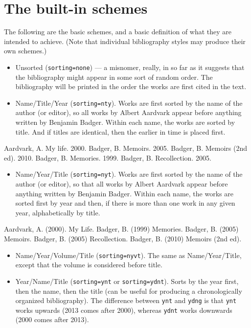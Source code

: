 \section{The built-in schemes}

The following are the basic schemes, and a basic definition of what they
are intended to achieve. (Note that individual bibliography styles may
produce their own schemes.)

\begin{itemize}
\item
  Unsorted (\texttt{sorting=none}) --- a misnomer, really, in so far as
  it suggests that the bibliography might appear in some sort of random
  order. The bibliography will be printed in the order the works are
  first cited in the text.
\item
  Name/Title/Year (\texttt{sorting=nty}). Works are first sorted by the
  name of the author (or editor), so all works by Albert Aardvark appear
  before anything written by Benjamin Badger. Within each name, the
  works are sorted by title. And if titles are identical, then the
  earlier in time is placed first.
\end{itemize}

Aardvark, A. My life. 2000. Badger, B. Memoirs. 2005. Badger, B. Memoirs
(2nd ed). 2010. Badger, B. Memories. 1999. Badger, B. Recollection.
2005.

\begin{itemize}
\item
  Name/Year/Title (\texttt{sorting=nyt}). Works are first sorted by the
  name of the author (or editor), so that all works by Albert Aardvark
  appear before anything written by Benjamin Badger. Within each name,
  the works are sorted first by year and then, if there is more than one
  work in any given year, alphabetically by title.
\end{itemize}

Aardvark, A. (2000). My Life. Badger, B. (1999) Memories. Badger, B.
(2005) Memoirs. Badger, B. (2005) Recollection. Badger, B. (2010)
Memoirs (2nd ed).

\begin{itemize}
\item
  Name/Year/Volume/Title (\texttt{sorting=nyvt}). The same as
  Name/Year/Title, except that the volume is considered before title.
\item
  Year/Name/Title (\texttt{sorting=ynt} or \texttt{sorting=ydnt}). Sorts
  by the year first, then the name, then the title (can be useful for
  producing a chronologically organized bibliography). The difference
  between \texttt{ynt} and \texttt{ydng} is that \texttt{ynt} works
  upwards (2013 comes after 2000), whereas \texttt{ydnt} works downwards
  (2000 comes after 2013).
\end{itemize}

